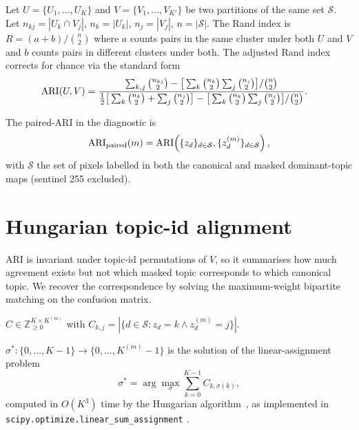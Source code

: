 \documentclass[11pt,a4paper]{article}
\begin{document}
\begin{definition}
Let $U = \{U_1, \ldots, U_K\}$ and $V = \{V_1, \ldots, V_{K'}\}$ be
two partitions of the same set $\mathcal{S}$. Let $n_{kj} = |U_k
\cap V_j|$, $n_k = |U_k|$, $n_j = |V_j|$, $n = |\mathcal{S}|$. The
Rand index is
$
R = (a + b)/\binom{n}{2}
$
where $a$ counts pairs in the same cluster under both $U$ and $V$
and $b$ counts pairs in different clusters under both. The adjusted
Rand index corrects for chance via the standard form
\begin{align}
\mathrm{ARI}(U, V)
&= \frac{\sum_{k,j} \binom{n_{kj}}{2}
       - \big[\sum_k \binom{n_k}{2} \sum_j \binom{n_j}{2}\big]/\binom{n}{2}}
       {\tfrac{1}{2}\big[\sum_k \binom{n_k}{2} + \sum_j \binom{n_j}{2}\big]
       - \big[\sum_k \binom{n_k}{2} \sum_j \binom{n_j}{2}\big]/\binom{n}{2}}.
\nonumber
\end{align}
\end{definition}

The paired-ARI in the diagnostic is
\begin{equation}
\mathrm{ARI}_{\text{paired}}(m) = \mathrm{ARI}\!\left(
  \{z_d\}_{d \in \mathcal{S}}, \{z^{(m)}_d\}_{d \in \mathcal{S}}
\right),
\end{equation}
with $\mathcal{S}$ the set of pixels labelled in both the canonical
and masked dominant-topic maps (sentinel 255 excluded).

\section{Hungarian topic-id alignment}

ARI is invariant under topic-id permutations of $V$, so it summarises
how much agreement exists but not which masked topic corresponds to
which canonical topic. We recover the correspondence by solving the
maximum-weight bipartite matching on the confusion matrix.

\begin{definition}
$C \in \mathbb{Z}_{\ge 0}^{K \times K^{(m)}}$ with
$C_{k,j} = |\{d \in \mathcal{S} : z_d = k \wedge z^{(m)}_d = j\}|$.
\end{definition}

\begin{definition}
$\sigma^* : \{0, \ldots, K-1\} \to \{0, \ldots, K^{(m)}-1\}$ is the
solution of the linear-assignment problem
\begin{equation}
\sigma^* = \arg\max_{\sigma}
\sum_{k=0}^{K-1} C_{k, \sigma(k)},
\end{equation}
computed in $O(K^3)$ time by the Hungarian
algorithm~\cite{kuhn1955hungarian}, as implemented in
\texttt{scipy.optimize.linear\_sum\_assignment}
\cite{scipy_assignment,virtanen2020scipy}.
\end{definition}
\end{document}
